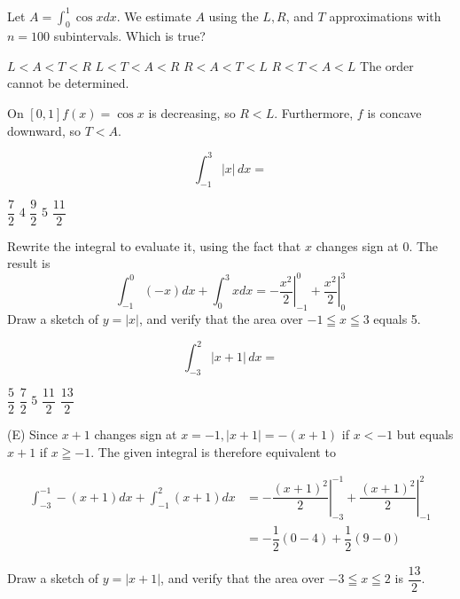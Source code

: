 \newpage




\question
Let $A=\int_{0}^{1} \cos x d x$. We estimate $A$ using the $L, R$, and $T$ approximations with $n=100$ subintervals. Which is true?
\begin{choices}
  \choice $L<A<T<R$
  \choice $L<T<A<R$
  \choice $R<A<T<L$
  \CorrectChoice $R<T<A<L$
  \choice The order cannot be determined.
\end{choices}
\begin{solution}
On $[0,1] f(x)=\cos x$ is decreasing, so $R<L$. Furthermore, $f$ is concave downward, so $T<A$.
\end{solution}

\question
\[
\int_{-1}^{3}|x|\,dx=
\]
\begin{choices}
  \choice $\dfrac{7}{2}$
  \choice $4$
  \choice $\dfrac{9}{2}$
  \CorrectChoice $5$
  \choice $\dfrac{11}{2}$
\end{choices}
\begin{solution}
Rewrite the integral to evaluate it, using the fact that $x$ changes sign at 0.
The result is
\[
\int_{-1}^{0}(-x) d x+\int_{0}^{3} x d x=-\left.\dfrac{x^{2}}{2}\right|_{-1} ^{0}+\left.\dfrac{x^{2}}{2}\right|_{0} ^{3}
\]
Draw a sketch of $y=|x|$, and verify that the area over $-1 \leqq x \leqq 3$ equals 5.
\end{solution}




\newpage




\question
\[
\int_{-3}^{2}|x+1|\,dx=
\]
\begin{choices}
  \choice $\dfrac{5}{2}$
  \choice $\dfrac{7}{2}$
  \choice $5$
  \choice $\dfrac{11}{2}$
  \CorrectChoice $\dfrac{13}{2}$
\end{choices}
\begin{solution}
(E) Since $x+1$ changes sign at $x=-1,|x+1|=-(x+1)$ if $x<-1$ but equals $x+1$ if $x \geqq-1$. The given integral is therefore equivalent to

\[
\begin{aligned}
\int_{-3}^{-1}-(x+1) d x+\int_{-1}^{2}(x+1) d x & =-\left.\dfrac{(x+1)^{2}}{2}\right|_{-3} ^{-1}+\left.\dfrac{(x+1)^{2}}{2}\right|_{-1} ^{2} \\
& =-\dfrac{1}{2}(0-4)+\dfrac{1}{2}(9-0)
\end{aligned}
\]

Draw a sketch of $y=|x+1|$, and verify that the area over $-3 \leqq x \leqq 2$ is $\dfrac{13}{2}$.
\end{solution}

